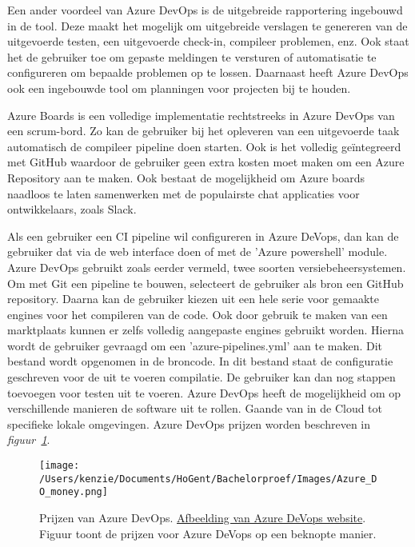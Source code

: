 Een ander voordeel van Azure DevOps is de uitgebreide rapportering ingebouwd in de tool. Deze maakt het mogelijk om uitgebreide verslagen te genereren van de uitgevoerde testen, een uitgevoerde check-in, compileer problemen, enz. Ook staat het de gebruiker toe om gepaste meldingen te versturen of automatisatie te configureren om bepaalde problemen op te lossen. Daarnaast heeft Azure DevOps ook een ingebouwde tool om planningen voor projecten bij te houden.

Azure Boards is een volledige implementatie rechtstreeks in Azure DevOps van een scrum-bord. Zo kan de gebruiker bij het opleveren van een uitgevoerde taak automatisch de compileer pipeline doen starten. Ook is het volledig geïntegreerd met GitHub waardoor de gebruiker geen extra kosten moet maken om een Azure Repository aan te maken. Ook bestaat de mogelijkheid om Azure boards naadloos te laten samenwerken met de populairste chat applicaties voor ontwikkelaars, zoals Slack.

Als een gebruiker een CI pipeline wil configureren in Azure DeVops, dan kan de gebruiker dat via de web interface doen of met de 'Azure powershell' module. Azure DevOps gebruikt zoals eerder vermeld, twee soorten versiebeheersystemen. Om met Git een pipeline te bouwen, selecteert de gebruiker als bron een GitHub repository. Daarna kan de gebruiker kiezen uit een hele serie voor gemaakte engines voor het compileren van de code. Ook door gebruik te maken van een marktplaats kunnen er zelfs volledig aangepaste engines gebruikt worden. Hierna wordt de gebruiker gevraagd om een 'azure-pipelines.yml' aan te maken. Dit bestand wordt opgenomen in de broncode. In dit bestand staat de configuratie geschreven voor de uit te voeren compilatie. De gebruiker kan dan nog stappen toevoegen voor testen uit te voeren. Azure DevOps heeft de mogelijkheid om op verschillende manieren de software uit te rollen. Gaande van in de Cloud tot specifieke lokale omgevingen. Azure DevOps prijzen worden beschreven in \emph{figuur~\ref{fig:A_DO_Money}}.

\begin{figure}[!htbp]
    \centering
    \texttt{[image: /Users/kenzie/Documents/HoGent/Bachelorproef/Images/Azure\_DO\_money.png]}
    \caption{Prijzen van Azure DevOps. \href{https://azure.microsoft.com/nl-nl/pricing/details/devops/azure-devops-services/}{Afbeelding van Azure DeVops website}. Figuur toont de prijzen voor Azure DeVops op een beknopte manier.}
    \label{fig:A_DO_Money}
\end{figure}

